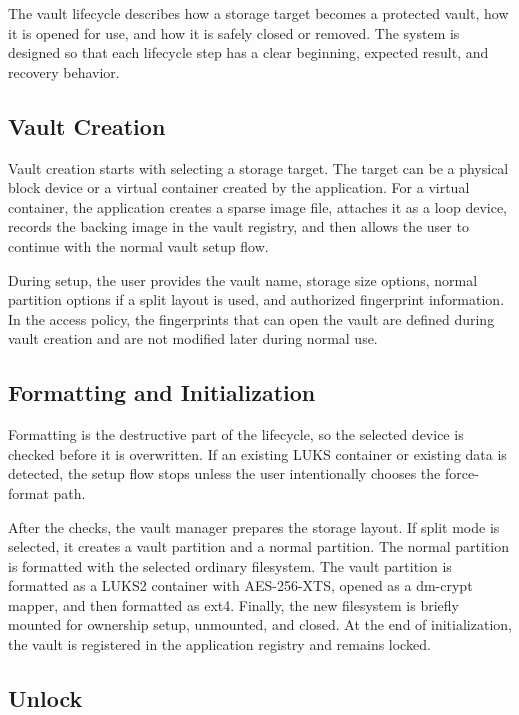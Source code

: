 The vault lifecycle describes how a storage target becomes a protected vault, how it is opened for use, and how it is safely closed or removed. The system is designed so that each lifecycle step has a clear beginning, expected result, and recovery behavior.

\subsection{Vault Creation}

Vault creation starts with selecting a storage target. The target can be a physical block device or a virtual container created by the application. For a virtual container, the application creates a sparse image file, attaches it as a loop device, records the backing image in the vault registry, and then allows the user to continue with the normal vault setup flow.

During setup, the user provides the vault name, storage size options, normal partition options if a split layout is used, and authorized fingerprint information. In the access policy, the fingerprints that can open the vault are defined during vault creation and are not modified later during normal use.

\subsection{Formatting and Initialization}

Formatting is the destructive part of the lifecycle, so the selected device is checked before it is overwritten. If an existing LUKS container or existing data is detected, the setup flow stops unless the user intentionally chooses the force-format path.

After the checks, the vault manager prepares the storage layout. If split mode is selected, it creates a vault partition and a normal partition. The normal partition is formatted with the selected ordinary filesystem. The vault partition is formatted as a LUKS2 container with AES-256-XTS, opened as a dm-crypt mapper, and then formatted as ext4. Finally, the new filesystem is briefly mounted for ownership setup, unmounted, and closed. At the end of initialization, the vault is registered in the application registry and remains locked.

\subsection{Unlock}

